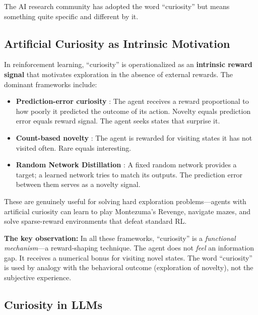 The AI research community has adopted the word ``curiosity'' but means something quite specific and different by it.

\subsection{Artificial Curiosity as Intrinsic Motivation}\label{subsec:intrinsic-motivation}

In reinforcement learning, ``curiosity'' is operationalized as an \textbf{intrinsic reward signal} that motivates exploration in the absence of external rewards. The dominant frameworks include:

\begin{itemize}[leftmargin=*]
  \item \textbf{Prediction-error curiosity} \citep{schmidhuber1991,pathak2017}: The agent receives a reward proportional to how poorly it predicted the outcome of its action. Novelty equals prediction error equals reward signal. The agent seeks states that surprise it.

  \item \textbf{Count-based novelty} \citep{bellemare2016}: The agent is rewarded for visiting states it has not visited often. Rare equals interesting.

  \item \textbf{Random Network Distillation} \citep{burda2019}: A fixed random network provides a target; a learned network tries to match its outputs. The prediction error between them serves as a novelty signal.
\end{itemize}

These are genuinely useful for solving hard exploration problems---agents with artificial curiosity can learn to play Montezuma's Revenge, navigate mazes, and solve sparse-reward environments that defeat standard RL.

\textbf{The key observation:} In all these frameworks, ``curiosity'' is a \emph{functional mechanism}---a reward-shaping technique. The agent does not \emph{feel} an information gap. It receives a numerical bonus for visiting novel states. The word ``curiosity'' is used by analogy with the behavioral outcome (exploration of novelty), not the subjective experience.

\subsection{Curiosity in LLMs}\label{subsec:llm-curiosity}

